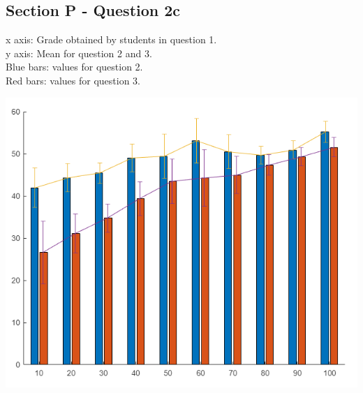 \documentclass{article}
\begin{document}
\subsection*{Section P - Question 2c}
x axis: Grade obtained by students in question 1. \\
y axis: Mean for question 2 and 3. \\
Blue bars: values for question 2. \\
Red bars: values for question 3.
\begin{center}
    \includegraphics[scale=0.5]{q2_d}
\end{center}
\end{document}
